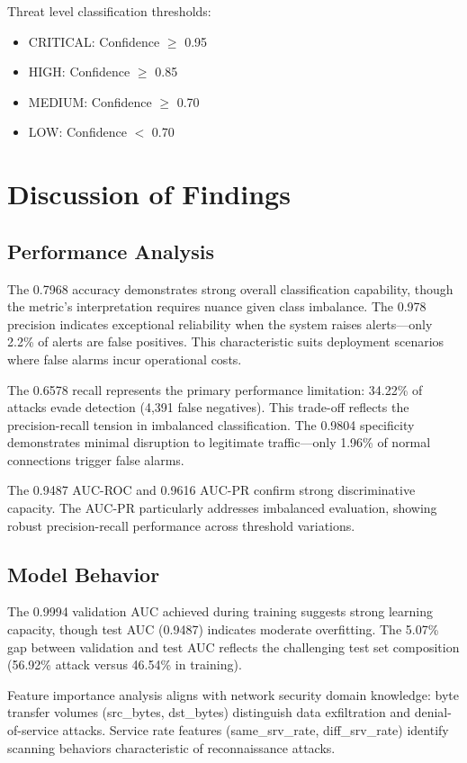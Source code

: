 \documentclass[12pt,a4paper]{report}
\begin{document}
Threat level classification thresholds:
\begin{itemize}
    \item CRITICAL: Confidence $\geq$ 0.95
    \item HIGH: Confidence $\geq$ 0.85
    \item MEDIUM: Confidence $\geq$ 0.70
    \item LOW: Confidence $<$ 0.70
\end{itemize}

\section{Discussion of Findings}

\subsection{Performance Analysis}

The 0.7968 accuracy demonstrates strong overall classification capability, though the metric's interpretation requires nuance given class imbalance. The 0.978 precision indicates exceptional reliability when the system raises alerts---only 2.2\% of alerts are false positives. This characteristic suits deployment scenarios where false alarms incur operational costs.

The 0.6578 recall represents the primary performance limitation: 34.22\% of attacks evade detection (4,391 false negatives). This trade-off reflects the precision-recall tension in imbalanced classification. The 0.9804 specificity demonstrates minimal disruption to legitimate traffic---only 1.96\% of normal connections trigger false alarms.

The 0.9487 AUC-ROC and 0.9616 AUC-PR confirm strong discriminative capacity. The AUC-PR particularly addresses imbalanced evaluation, showing robust precision-recall performance across threshold variations.

\subsection{Model Behavior}

The 0.9994 validation AUC achieved during training suggests strong learning capacity, though test AUC (0.9487) indicates moderate overfitting. The 5.07\% gap between validation and test AUC reflects the challenging test set composition (56.92\% attack versus 46.54\% in training).

Feature importance analysis aligns with network security domain knowledge: byte transfer volumes (src\_bytes, dst\_bytes) distinguish data exfiltration and denial-of-service attacks. Service rate features (same\_srv\_rate, diff\_srv\_rate) identify scanning behaviors characteristic of reconnaissance attacks.
\end{document}
